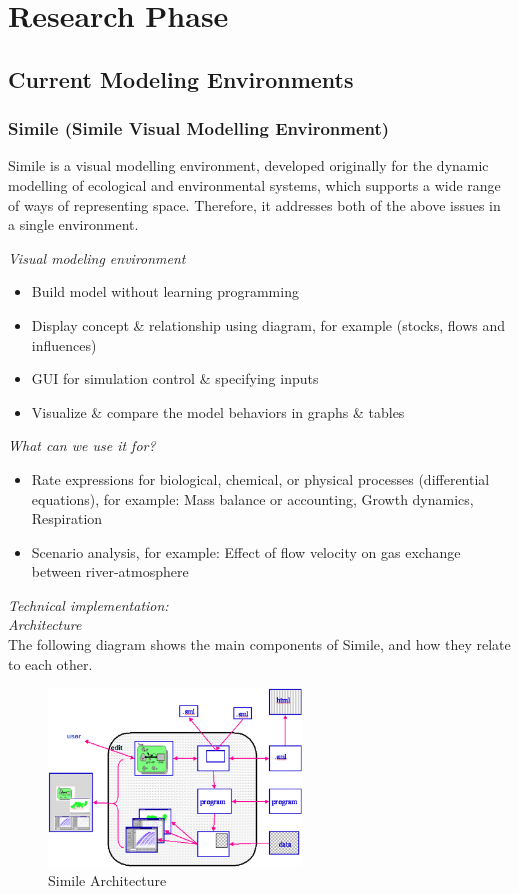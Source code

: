 \chapter{Research Phase}
\section{Current Modeling Environments}

\subsection{Simile (Simile Visual Modelling Environment)}
Simile is a visual modelling environment, developed originally for the dynamic modelling of ecological and environmental systems, which supports a wide range of ways of representing space. Therefore, it addresses both of the above issues in a single environment.

\emph{Visual modeling environment}
\begin{itemize}
	\item Build model without learning programming
	\item Display concept \& relationship using diagram, for example (stocks, flows and influences)
	\item GUI for simulation control \& specifying inputs
	\item Visualize \& compare the model behaviors in  graphs \& tables
\end{itemize}

\emph{What can we use it for?}
\begin{itemize}
	\item Rate expressions for biological, chemical, or physical processes (differential equations), for example: Mass balance or accounting, Growth dynamics, Respiration
	\item Scenario analysis, for example: Effect of flow velocity on gas exchange between  river-atmosphere
\end{itemize}

\emph{Technical implementation:}\\
\emph{Architecture}\\
The following diagram shows the main components of Simile, and how they relate to each
other.

\begin{figure}[htbp]
\centering
\includegraphics[width=0.6\textwidth]{pics/Simile_architecture.png}
\caption{Simile Architecture}
\label{fig:Simile Architecture}	
\end{figure}

